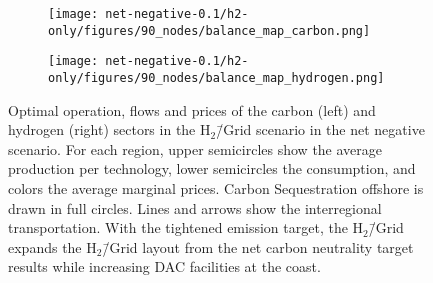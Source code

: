 \documentclass[twocolumn]{article}
\newcommand{\carbon}{CO$_2$}
\newcommand{\hydrogengrid}{H$_2$\=/Grid}
\newcommand{\hydrogenscenario}{H$_2$\=/Grid scenario}
\newcommand{\hybridscenario}{Hybrid scenario}
\begin{document}
\begin{figure}[ht!]
    \centering
    \begin{subfigure}{.5\textwidth}
        \centering
        \texttt{[image: net-negative-0.1/h2-only/figures/90\_nodes/balance\_map\_carbon.png]}
        \label{fig:balance_map_carbon_h2_nn}
    \end{subfigure}%
    \begin{subfigure}{.5\textwidth}
        \centering
        \texttt{[image: net-negative-0.1/h2-only/figures/90\_nodes/balance\_map\_hydrogen.png]}
        \label{fig:balance_map_hydrogen_h2_nn}
    \end{subfigure}
    \caption{Optimal operation, flows and prices of the carbon (left) and hydrogen (right) sectors in the \hydrogenscenario{} in the net negative scenario. For each region, upper semicircles show the average production per technology, lower semicircles the consumption, and colors the average marginal prices. Carbon Sequestration offshore is drawn in full circles. Lines and arrows show the interregional transportation. With the tightened emission target, the \hydrogengrid{} expands the \hydrogengrid{} layout from the net carbon neutrality target results while increasing DAC facilities at the coast.
    }
    \label{fig:balance_maps_h2_nn}
\end{figure}






\end{document}
